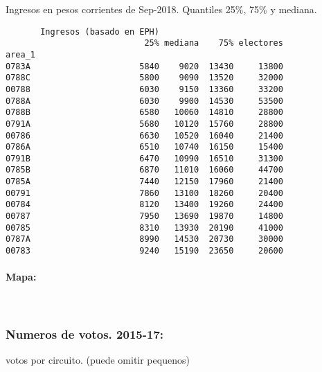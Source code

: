 \documentclass[11pt]{article}
\begin{document}
    
    Ingresos en pesos corrientes de Sep-2018. Quantiles 25\%, 75\% y
mediana.

    
    
    \begin{verbatim}
       Ingresos (basado en EPH)                         
                            25% mediana    75% electores
area_1                                                  
0783A                      5840    9020  13430     13800
0788C                      5800    9090  13520     32000
00788                      6030    9150  13360     33200
0788A                      6030    9900  14530     53500
0788B                      6580   10060  14810     28800
0791A                      5680   10120  15760     28800
00786                      6630   10520  16040     21400
0786A                      6510   10740  16150     15400
0791B                      6470   10990  16510     31300
0785B                      6870   11010  16060     44700
0785A                      7440   12150  17960     21400
00791                      7860   13100  18260     20400
00784                      8120   13400  19260     24400
00787                      7950   13690  19870     14800
00785                      8310   13930  20190     41000
0787A                      8990   14530  20730     30000
00783                      9240   15190  23650     20600
    \end{verbatim}

    
    \hypertarget{mapa}{%
\paragraph{Mapa:}\label{mapa}}

    
    \begin{center}
    \end{center}
    { \hspace*{\fill} \\}
    
    \hypertarget{numeros-de-votos.-2015-17}{%
\subsubsection{Numeros de votos.
2015-17:}\label{numeros-de-votos.-2015-17}}

    
    votos por circuito. (puede omitir pequenos)

    
    
\end{document}
